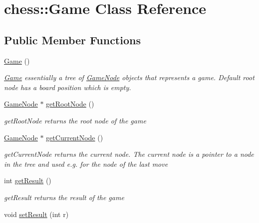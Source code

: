 \hypertarget{classchess_1_1Game}{\section{chess\-:\-:Game Class Reference}
\label{classchess_1_1Game}
}
\subsection*{Public Member Functions}
\begin{DoxyCompactItemize}
\item 
\hypertarget{classchess_1_1Game_adca9940d7473dcac562c2934d0e762a9}{\hyperlink{classchess_1_1Game_adca9940d7473dcac562c2934d0e762a9}{Game} ()}\label{classchess_1_1Game_adca9940d7473dcac562c2934d0e762a9}

\begin{DoxyCompactList}\small\item\em \hyperlink{classchess_1_1Game}{Game} essentially a tree of \hyperlink{classchess_1_1GameNode}{Game\-Node} objects that represents a game. Default root node has a board position which is empty. \end{DoxyCompactList}\item 
\hyperlink{classchess_1_1GameNode}{Game\-Node} $\ast$ \hyperlink{classchess_1_1Game_ac8425c271f2d8365f813e5e169f7d1ed}{get\-Root\-Node} ()
\begin{DoxyCompactList}\small\item\em get\-Root\-Node returns the root node of the game \end{DoxyCompactList}\item 
\hyperlink{classchess_1_1GameNode}{Game\-Node} $\ast$ \hyperlink{classchess_1_1Game_a77233d7bfe997d113300b3c4333258d4}{get\-Current\-Node} ()
\begin{DoxyCompactList}\small\item\em get\-Current\-Node returns the current node. The current node is a pointer to a node in the tree and used e.\-g. for the node of the last move \end{DoxyCompactList}\item 
int \hyperlink{classchess_1_1Game_aae095f72d044192f348c1f0b740aae32}{get\-Result} ()
\begin{DoxyCompactList}\small\item\em get\-Result returns the result of the game \end{DoxyCompactList}\item 
void \hyperlink{classchess_1_1Game_a9b10980b3b16b19c73e07034840ea3ea}{set\-Result} (int r)

\end{DoxyCompactItemize}
